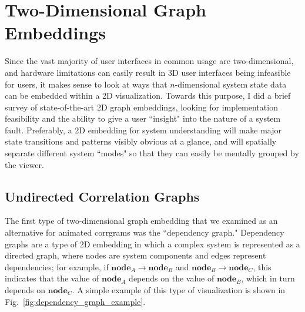 


\section{Two-Dimensional Graph Embeddings}

Since the vast majority of user interfaces in common usage are two-dimensional, and hardware limitations can easily result in 3D user interfaces being infeasible for users, it makes sense to look at ways that $n$-dimensional system state data can be embedded within a 2D visualization. Towards this purpose, I did a brief survey of state-of-the-art 2D graph embeddings, looking for implementation feasibility and the ability to give a user ``insight" into the nature of a system fault. Preferably, a 2D embedding for system understanding will make major state transitions and patterns visibly obvious at a glance, and will spatially separate different system ``modes" so that they can easily be mentally grouped by the viewer.

\subsection{Undirected Correlation Graphs}

The first type of two-dimensional graph embedding that we examined as an alternative for animated corrgrams was the ``dependency graph." Dependency graphs are a type of 2D embedding in which a complex system is represented as a directed graph, where nodes are system components and edges represent dependencies; for example, if $\textbf{node}_{A} \rightarrow \textbf{node}_{B}$ and $\textbf{node}_{B} \rightarrow \textbf{node}_{C}$, this indicates that the value of $\textbf{node}_{A}$ depends on the value of $\textbf{node}_{B}$, which in turn depends on $\textbf{node}_{C}$. A simple example of this type of visualization is shown in Fig.~\ref{fig:dependency_graph_example}.

